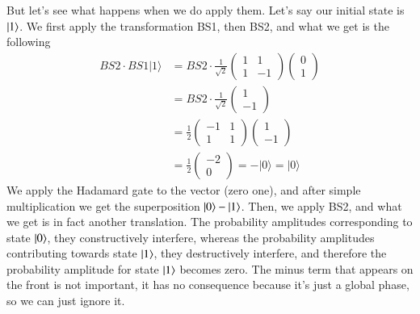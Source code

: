 But let's see what happens when we do apply them. Let's say our initial state is $\left| 1 \right\rangle$. We first apply the transformation BS1, then BS2, and what we get is the following
\begin{equation}
\begin{aligned}
B S 2 \cdot B S 1|1\rangle &=B S 2 \cdot \frac{1}{\sqrt{2}}\left(\begin{array}{cc}
1 & 1 \\
1 & -1
\end{array}\right)\left(\begin{array}{l}
0 \\
1
\end{array}\right) \\
&=B S 2 \cdot \frac{1}{\sqrt{2}}\left(\begin{array}{c}
1 \\
-1
\end{array}\right) \\
&=\frac{1}{2}\left(\begin{array}{cc}
-1 & 1 \\
1 & 1
\end{array}\right)\left(\begin{array}{c}
1 \\
-1
\end{array}\right) \\
&=\frac{1}{2}\left(\begin{array}{c}
-2 \\
0
\end{array}\right)=-|0\rangle=|0\rangle
\end{aligned}
\end{equation}
We apply the Hadamard gate to the vector (zero one), and after simple multiplication we get the superposition $\left| 0 \right\rangle-\left| 1 \right\rangle$. Then, we apply BS2, and what we get is in fact another translation. The probability amplitudes corresponding to state $\left| 0 \right\rangle$, they constructively interfere, whereas the probability amplitudes contributing towards state $\left| 1 \right\rangle$, they destructively interfere, and therefore the probability amplitude for state $\left| 1 \right\rangle$ becomes zero. The minus term that appears on the front is not important, it has no consequence because it's just a global phase, so we can just ignore it.
 
